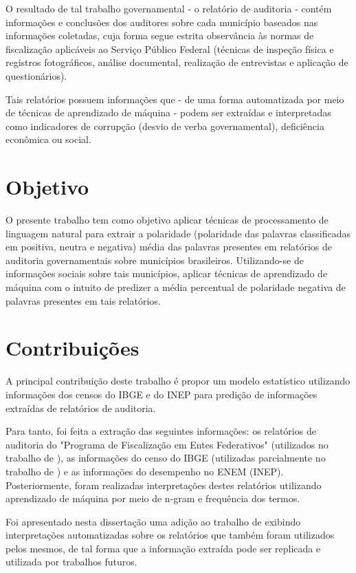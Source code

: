O resultado de tal trabalho governamental - o relatório de auditoria - contém informações e conclusões dos auditores sobre cada município baseados nas informações coletadas, cuja forma segue estrita observância às normas de fiscalização aplicáveis ao Serviço Público Federal (técnicas de inspeção física e registros fotográficos, análise documental, realização de entrevistas e aplicação de questionários).

Tais relatórios possuem informações que - de uma forma automatizada por meio de técnicas de aprendizado de máquina - podem ser extraídas e interpretadas como indicadores de corrupção (desvio de verba governamental), deficiência econômica ou social.

\section{Objetivo}
\label{sec:objetivo}

O presente trabalho tem como objetivo aplicar técnicas de processamento de linguagem natural para extrair a polaridade (polaridade das palavras classificadas em positiva, neutra e negativa) média das palavras presentes em relatórios de auditoria governamentais sobre municípios brasileiros. Utilizando-se de informações sociais sobre tais municípios, aplicar técnicas de aprendizado de máquina com o intuito de predizer a média percentual de polaridade negativa de palavras presentes em tais relatórios.

\section{Contribuições}
\label{sec:contribuicoes}

A principal contribuição deste trabalho é propor um modelo estatístico utilizando informações dos censos do IBGE e do INEP para predição de informações extraídas de relatórios de auditoria.

Para tanto, foi feita a extração das seguintes informações: os relatórios de auditoria do "Programa de Fiscalização em Entes Federativos" (utilizados no trabalho de \citet{FerrazFinan2008}), as informações do censo do IBGE (utilizadas parcialmente no trabalho de \citet{Goldani2001}) e as informações do desempenho no ENEM (INEP). Posteriormente, foram realizadas interpretações destes relatórios utilizando aprendizado de máquina por meio de n-gram e frequência dos termos.

Foi apresentado nesta dissertação uma adição ao trabalho de \citet{FerrazFinan2008} exibindo interpretações automatizadas sobre os relatórios que também foram utilizados pelos mesmos, de tal forma que a informação extraída pode ser replicada e utilizada por trabalhos futuros.

